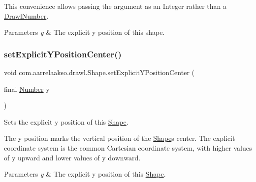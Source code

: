 This convenience allows passing the argument as an Integer rather than a \hyperlink{classcom_1_1aarrelaakso_1_1drawl_1_1_drawl_number}{Drawl\+Number}.


\begin{DoxyParams}{Parameters}
{\em y} & The explicit y position of this shape. \\
\hline
\end{DoxyParams}
\mbox{\label{classcom_1_1aarrelaakso_1_1drawl_1_1_shape_a7d49d69bd74e57c3a3341a025c3cce50}} 
\subsubsection{\texorpdfstring{set\+Explicit\+Y\+Position\+Center()}{setExplicitYPositionCenter()}\hspace{0.1cm}{\footnotesize\ttfamily [2/2]}}
{\footnotesize\ttfamily void com.\+aarrelaakso.\+drawl.\+Shape.\+set\+Explicit\+Y\+Position\+Center (\begin{DoxyParamCaption}\item[{final \hyperlink{interfacecom_1_1aarrelaakso_1_1drawl_1_1_number}{Number}}]{y }\end{DoxyParamCaption})\hspace{0.3cm}{\ttfamily [protected]}}



Sets the explicit y position of this \hyperlink{classcom_1_1aarrelaakso_1_1drawl_1_1_shape}{Shape}. 

The y position marks the vertical position of the \hyperlink{classcom_1_1aarrelaakso_1_1drawl_1_1_shape}{Shape}\textquotesingle{}s center. The explicit coordinate system is the common Cartesian coordinate system, with higher values of y upward and lower values of y downward.


\begin{DoxyParams}{Parameters}
{\em y} & The explicit y position of this \hyperlink{classcom_1_1aarrelaakso_1_1drawl_1_1_shape}{Shape}. \\
\hline
\end{DoxyParams}
\mbox{\label{classcom_1_1aarrelaakso_1_1drawl_1_1_shape_a81ff4feb49b8f74c1a639564748a23ee}} 
